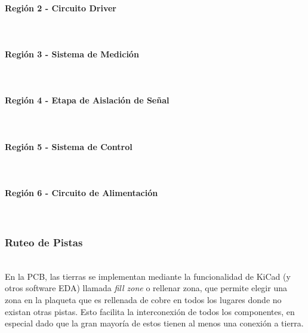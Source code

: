 \paragraph{Región 2 - Circuito Driver}

\lipsum[1]\\

\paragraph{Región 3 - Sistema de Medición}

\lipsum[2]\\

\paragraph{Región 4 - Etapa de Aislación de Señal}

\lipsum[3]\\

\paragraph{Región 5 - Sistema de Control}

\lipsum[4]\\

\paragraph{Región 6 - Circuito de Alimentación}

\lipsum[5]\\

\subsubsection{Ruteo de Pistas}

\lipsum[6]\\

En la PCB, las tierras se implementan mediante la funcionalidad de KiCad (y otros software EDA) llamada \textit{fill zone} o rellenar zona, que permite elegir una zona en la plaqueta que es rellenada de cobre en todos los lugares donde no existan otras pistas. Esto facilita la interconexión de todos los componentes, en especial dado que la gran mayoría de estos tienen al menos una conexión a tierra.\\

\newpage\afterpage{\blankpage}

